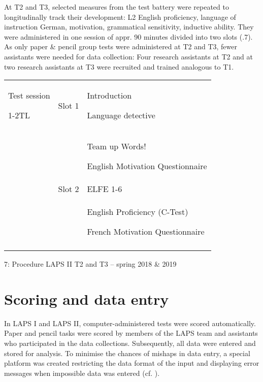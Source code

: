 \documentclass[output=paper]{langsci/langscibook}
\begin{document}
At T2 and T3, selected measures from the test battery were repeated to longitudinally track their development: L2 English proficiency, language of instruction German, motivation, grammatical sensitivity, inductive ability. They were administered in one session of appr. 90 minutes divided into two slots (.7). As only paper \& pencil group tests were administered at T2 and T3, fewer assistants were needed for data collection: Four research assistants at T2 and at two research assistants at T3 were recruited and trained analogous to T1.


\begin{tabularx}{\textwidth}{XXX}

\lsptoprule

Test session

1-2TL & Slot 1 & Introduction

Language detective\\
 &  & Team up Words!

English Motivation Questionnaire\\
 & Slot 2 & ELFE 1-6\\
 &  & English Proficiency (C-Test)

French Motivation Questionnaire\\
\lspbottomrule
\end{tabularx}
\begin{table}
\caption{7: Procedure LAPS II T2 and T3 – spring 2018 \& 2019}
\label{tab:02:2}
\end{table}

\section{Scoring and data entry}

In LAPS I and LAPS II, computer-administered tests were scored automatically. Paper and pencil tasks were scored by members of the LAPS team and assistants who participated in the data collections. Subsequently, all data were entered and stored for analysis. To minimise the chances of mishaps in data entry, a special platform was created restricting the data format of the input and displaying error messages when impossible data was entered (cf. \citealt{Vanhove2018}). 
\end{document}
